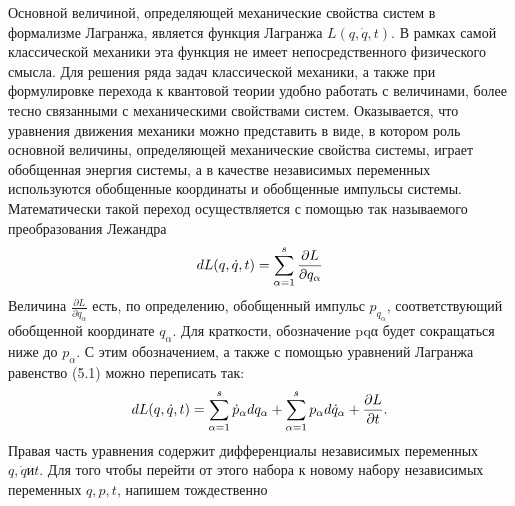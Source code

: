 \documentclass[__main__.tex]{subfiles}
\begin{document}
	Основной величиной, определяющей механические свойства систем в формализме
	Лагранжа, является функция Лагранжа $L(q,\dot{q},t)$. В рамках самой классической механики
	эта функция не имеет непосредственного физического смысла. Для решения ряда задач
	классической механики, а также при формулировке перехода к квантовой теории удобно
	работать с величинами, более тесно связанными с механическими свойствами систем. Оказывается, что уравнения движения механики можно представить в виде, в котором роль
	основной величины, определяющей механические свойства системы, играет обобщенная
	энергия системы, а в качестве независимых переменных используются обобщенные координаты и обобщенные импульсы системы. Математически такой переход осуществляется
	с помощью так называемого преобразования Лежандра
	\begin{gather}
	\llabel{21-fulldiffLagr}
	dL(q,\dot{q},t) = \sum_{\alpha=1}^{s}\frac{\partial{L}}{\partial{q_\alpha}}	
	\end{gather}
	Величина $\frac{\partial{L}}{\partial{\dot{q}_\alpha}}$ есть, по определению, обобщенный импульс $p_{q_\alpha}$, соответствующий обобщенной координате $q_α$. Для краткости, обозначение pqα будет сокращаться ниже до $p_α$. С этим обозначением, а также с помощью уравнений Лагранжа равенство (5.1) можно
	переписать так:
	\begin{gather}
	\llabel{21-fulldifflagr}
	dL(q,\dot{q},t) = \sum_{\alpha=1}^{s}\dot{p}_\alpha dq_{\alpha} + \sum_{\alpha=1}^{s}p_\alpha d\dot{q}_\alpha + \frac{\partial{L}}{\partial{t}}.
	\end{gather}
	Правая часть уравнения  содержит дифференциалы независимых переменных $q, \dot{q} и t$. Для того чтобы перейти от этого набора к новому набору независимых переменных $q, p, t$, напишем тождественно
	
\end{document}
